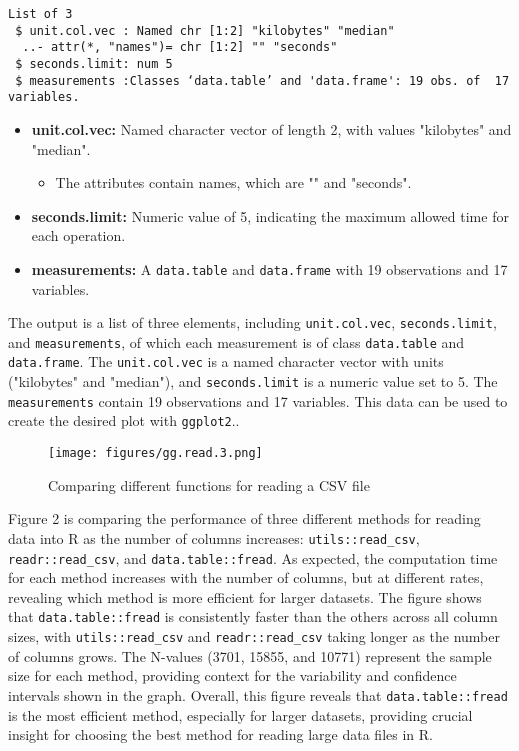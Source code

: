 \begin{verbatim}
List of 3
 $ unit.col.vec : Named chr [1:2] "kilobytes" "median"
  ..- attr(*, "names")= chr [1:2] "" "seconds"
 $ seconds.limit: num 5
 $ measurements :Classes ‘data.table’ and 'data.frame':	19 obs. of  17 variables.
\end{verbatim}

\begin{itemize}
    \item \textbf{unit.col.vec:} Named character vector of length 2, with values "kilobytes" and "median".
    \begin{itemize}
        \item The attributes contain names, which are "" and "seconds".
    \end{itemize}

    \item \textbf{seconds.limit:} Numeric value of 5, indicating the maximum allowed time for each operation.

    \item \textbf{measurements:} A \texttt{data.table} and \texttt{data.frame} with 19 observations and 17 variables.
\end{itemize}

\noindent The output is a list of three elements, including \texttt{unit.col.vec}, \texttt{seconds.limit}, and \texttt{measurements}, of which each measurement is of class \texttt{data.table} and \texttt{data.frame}. The \texttt{unit.col.vec} is a named character vector with units ("kilobytes" and "median"), and \texttt{seconds.limit} is a numeric value set to 5. The \texttt{measurements} contain 19 observations and 17 variables. This data can be used to create the desired plot with \texttt{ggplot2}..

\begin{figure}[H]
    \centering
    \texttt{[image: figures/gg.read.3.png]}
    \caption{Comparing different functions for reading a CSV file}
    \label{fig:label2}
\end{figure}

\noindent Figure 2 is comparing the performance of three different methods for reading data into R as the number of columns increases: \texttt{utils::read\_csv}, \texttt{readr::read\_csv}, and \texttt{data.table::fread}. As expected, the computation time for each method increases with the number of columns, but at different rates, revealing which method is more efficient for larger datasets. The figure shows that \texttt{data.table::fread} is consistently faster than the others across all column sizes, with \texttt{utils::read\_csv} and \texttt{readr::read\_csv} taking longer as the number of columns grows. The N-values (3701, 15855, and 10771) represent the sample size for each method, providing context for the variability and confidence intervals shown in the graph. Overall, this figure reveals that \texttt{data.table::fread} is the most efficient method, especially for larger datasets, providing crucial insight for choosing the best method for reading large data files in R.\\

